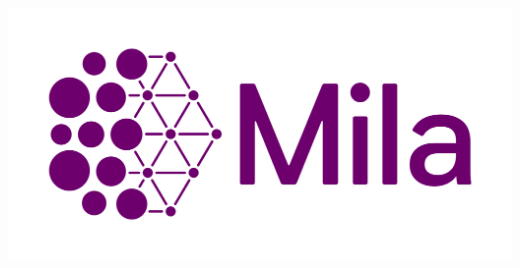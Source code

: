 \documentclass[portrait,a0b,final,a4resizeable]{a0poster}
\begin{document}
\begin{poster}
{    \begin{minipage}[c][0.1\paperheight][c]{0.33\textwidth}\includegraphics[height=4in]{../figures/mila.png} \end{minipage}

    }
\end{poster}
\end{document}
